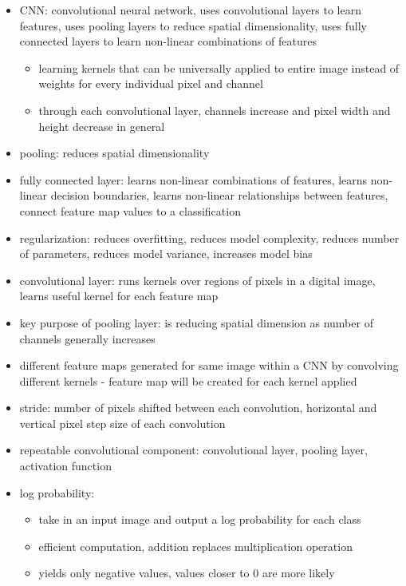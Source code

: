 \documentclass[10pt]{article}
\begin{document}
\begin{itemize}[label=\(\star\), leftmargin=1em, itemsep=-0.3em]
    \item CNN: convolutional neural network, uses convolutional layers to learn features, uses pooling layers to reduce spatial dimensionality, uses fully connected layers to learn non-linear combinations of features
          \begin{itemize}[label=\(\star\), leftmargin=1em, itemsep=-0.3em]
              \item learning kernels that can be universally applied to entire image instead of weights for every individual pixel and channel
              \item through each convolutional layer, channels increase and pixel width and height decrease in general
          \end{itemize}
    \item pooling: reduces spatial dimensionality
    \item fully connected layer: learns non-linear combinations of features, learns non-linear decision boundaries, learns non-linear relationships between features, connect feature map values to a classification
    \item regularization: reduces overfitting, reduces model complexity, reduces number of parameters, reduces model variance, increases model bias
    \item convolutional layer: runs kernels over regions of pixels in a digital image, learns useful kernel for each feature map
    \item key purpose of pooling layer: is reducing spatial dimension as number of channels generally increases
    \item different feature maps generated for same image within a CNN by convolving different kernels - feature map will be created for each kernel applied
    \item stride: number of pixels shifted between each convolution, horizontal and vertical pixel step size of each convolution
    \item repeatable convolutional component: convolutional layer, pooling layer, activation function
    \item log probability:
          \begin{itemize}[label=\(\star\), leftmargin=1em, itemsep=-0.3em]
              \item take in an input image and output a log probability for each class
              \item efficient computation, addition replaces multiplication operation
              \item yields only negative values, values closer to 0 are more likely
          \end{itemize}
\end{itemize}
\end{document}
